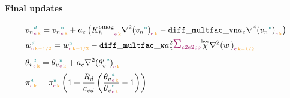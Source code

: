 \paragraph{Final updates}

\begin{align}
  & \vn{d}{\e}{\k} = \vn{\n}{\e}{\k} + \edgearea \left( \Khsmag{}{\e}{\k} \vnlapl{\n}{\e}{\k} - \diffmultfacvn \edgearea \vnlapllapl{\n}{\e}{\k} \right) \\
  & \w{d}{\c}{\k-1/2} = \w{\n}{\c}{\k-1/2} - \diffmultfacw \cellarea^2 \sum_{\offProv{c2e2co}} \Whor \wlapl{}{\c}{\k-1/2} \\
  & \vpotemp{d}{\c}{\k} = \vpotemp{\n}{\c}{\k} + \cellarea \vpotempprimelapl{\n}{\c}{\k} \\
  & \exner{d}{\c}{\k} = \exner{\n}{\c}{\k} \left( 1 + \frac{\Rd}{\cvd} \left( \frac{\vpotemp{d}{\c}{\k}}{\vpotemp{\n}{\c}{\k}} -1 \right) \right)
\end{align}
